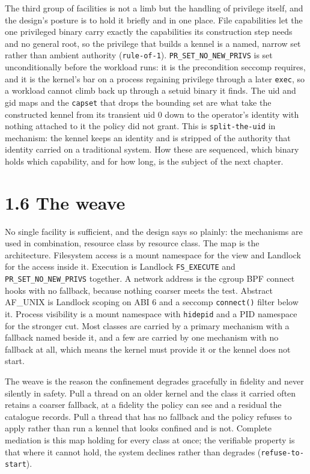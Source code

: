 The third group of facilities is not a limb but the handling of
privilege itself, and the design's posture is to hold it briefly and in
one place. File capabilities let the one privileged binary carry exactly
the capabilities its construction step needs and no general root, so the
privilege that builds a kennel is a named, narrow set rather than
ambient authority (\texttt{rule-of-1}). \texttt{PR\_SET\_NO\_NEW\_PRIVS}
is set unconditionally before the workload runs: it is the precondition
seccomp requires, and it is the kernel's bar on a process regaining
privilege through a later \texttt{exec}, so a workload cannot climb back
up through a setuid binary it finds. The uid and gid maps and the
\texttt{capset} that drops the bounding set are what take the
constructed kennel from its transient uid 0 down to the operator's
identity with nothing attached to it the policy did not grant. This is
\texttt{split-the-uid} in mechanism: the kennel keeps an identity and is
stripped of the authority that identity carried on a traditional system.
How these are sequenced, which binary holds which capability, and for
how long, is the subject of the next chapter.

\hypertarget{the-weave}{%
\section{1.6 The weave}\label{the-weave}}

No single facility is sufficient, and the design says so plainly: the
mechanisms are used in combination, resource class by resource class.
The map is the architecture. Filesystem access is a mount namespace for
the view and Landlock for the access inside it. Execution is Landlock
\texttt{FS\_EXECUTE} and \texttt{PR\_SET\_NO\_NEW\_PRIVS} together. A
network address is the cgroup BPF connect hooks with no fallback,
because nothing coarser meets the test. Abstract AF\_UNIX is Landlock
scoping on ABI 6 and a seccomp \texttt{connect()} filter below it.
Process visibility is a mount namespace with \texttt{hidepid} and a PID
namespace for the stronger cut. Most classes are carried by a primary
mechanism with a fallback named beside it, and a few are carried by one
mechanism with no fallback at all, which means the kernel must provide
it or the kennel does not start.

The weave is the reason the confinement degrades gracefully in fidelity
and never silently in safety. Pull a thread on an older kernel and the
class it carried often retains a coarser fallback, at a fidelity the
policy can see and a residual the catalogue records. Pull a thread that
has no fallback and the policy refuses to apply rather than run a kennel
that looks confined and is not. Complete mediation is this map holding
for every class at once; the verifiable property is that where it cannot
hold, the system declines rather than degrades
(\texttt{refuse-to-start}).


